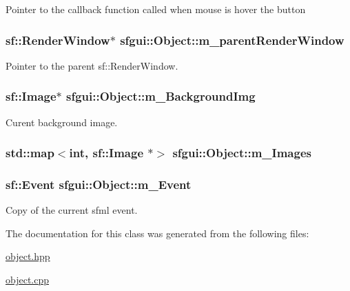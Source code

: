 Pointer to the callback function called when mouse is hover the button \hypertarget{classsfgui_1_1Object_518ad23f1c9aab6fd9b346d708c503a8}{
\subsubsection[m\_\-parentRenderWindow]{\setlength{\rightskip}{0pt plus 5cm}sf::RenderWindow$\ast$ {\bf sfgui::Object::m\_\-parentRenderWindow}}}
\label{classsfgui_1_1Object_518ad23f1c9aab6fd9b346d708c503a8}


Pointer to the parent sf::RenderWindow. 

\hypertarget{classsfgui_1_1Object_08225eee55352c02435d14e1bce24dbe}{
\subsubsection[m\_\-BackgroundImg]{\setlength{\rightskip}{0pt plus 5cm}sf::Image$\ast$ {\bf sfgui::Object::m\_\-BackgroundImg}}}
\label{classsfgui_1_1Object_08225eee55352c02435d14e1bce24dbe}


Curent background image. 

\hypertarget{classsfgui_1_1Object_6d7907f767742dcfd37c1b0c349daa2d}{
\subsubsection[m\_\-Images]{\setlength{\rightskip}{0pt plus 5cm}std::map$<$int, sf::Image $\ast$$>$ {\bf sfgui::Object::m\_\-Images}}}
\label{classsfgui_1_1Object_6d7907f767742dcfd37c1b0c349daa2d}


\hypertarget{classsfgui_1_1Object_bd45c91f926c930806870ce8acbb955e}{
\subsubsection[m\_\-Event]{\setlength{\rightskip}{0pt plus 5cm}sf::Event {\bf sfgui::Object::m\_\-Event}}}
\label{classsfgui_1_1Object_bd45c91f926c930806870ce8acbb955e}


Copy of the current sfml event. 



The documentation for this class was generated from the following files:\begin{CompactItemize}
\item 
\hyperlink{object_8hpp}{object.hpp}\item 
\hyperlink{object_8cpp}{object.cpp}\end{CompactItemize}
